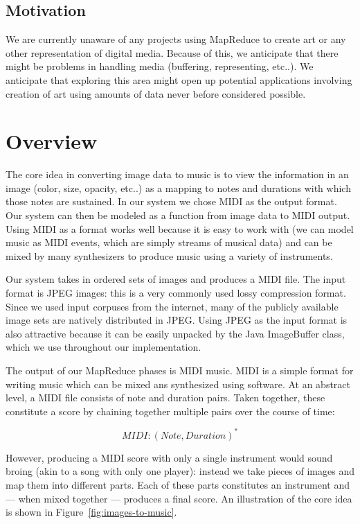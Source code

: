 \documentclass[10pt, conference, compsocconf]{IEEEtran}
\newcommand{\code}[1]{\textsf{\small #1}}
\begin{document}
\subsection{Motivation} 

We are currently unaware of any projects using MapReduce to create art
or any other representation of digital media.  Because of this, we
anticipate that there might be problems in handling media (buffering,
representing, etc..).  We anticipate that exploring this area might
open up potential applications involving creation of art using amounts
of data never before considered possible.

\section{Overview}
\label{sec:overview}

The core idea in converting image data to music is to view the
information in an image (color, size, opacity, etc..) as a mapping to
notes and durations with which those notes are sustained.  In our
system we chose MIDI as the output format.  Our system can then be
modeled as a function from image data to MIDI output.  Using MIDI as a
format works well because it is easy to work with (we can model music
as MIDI events, which are simply streams of musical data) and can be
mixed by many synthesizers to produce music using a variety of
instruments.

Our system takes in ordered sets of images and produces a MIDI file.
The input format is JPEG images: this is a very commonly used lossy
compression format.  Since we used input corpuses from the internet,
many of the publicly available image sets are natively distributed in
JPEG.  Using JPEG as the input format is also attractive because it
can be easily unpacked by the Java \code{ImageBuffer} class, which we
use throughout our implementation.

The output of our MapReduce phases is MIDI music.  MIDI is a simple
format for writing music which can be mixed ans synthesized using
software.  At an abstract level, a MIDI file consists of note and
duration pairs.  Taken together, these constitute a score by chaining
together multiple pairs over the course of time:

\[
MIDI : (Note,Duration)^{\ast}
\]

However, producing a MIDI score with only a single instrument would
sound broing (akin to a song with only one player): instead we take
pieces of images and map them into different parts.  Each of these
parts constitutes an instrument and --- when mixed together ---
produces a final score.  An illustration of the core idea is shown in
Figure~\ref{fig:images-to-music}.
\end{document}
